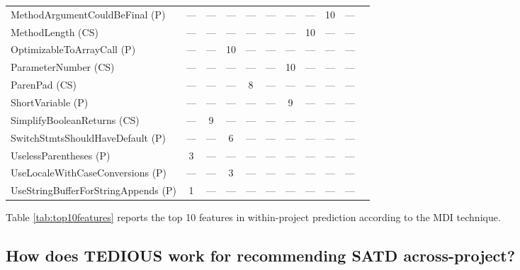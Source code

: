 \begin{table*}[t]
{\begin{tabular}{lcccccccccc}
				\rowcolor{grey}
				MethodArgumentCouldBeFinal (P) &---&---&---&---&---&---&---&10&---\\
				MethodLength (CS) &---&---&---&---&---&---&10&---&---\\
				\rowcolor{grey}
				OptimizableToArrayCall (P) &---&---&10&---&---&---&---&---&---\\
				ParameterNumber (CS) &---&---&---&---&---&10&---&---&---\\
				\rowcolor{grey}
				ParenPad (CS) &---&---&---&8&---&---&---&---&---\\
				ShortVariable (P) &---&---&---&---&---&9&---&---&---\\
				\rowcolor{grey}
				SimplifyBooleanReturns (CS) &---&9&---&---&---&---&---&---&---\\
				SwitchStmtsShouldHaveDefault (P) &---&---&6&---&---&---&---&---&---\\
				\rowcolor{grey}
				UselessParentheses (P) &3&---&---&---&---&---&---&---&---\\
				UseLocaleWithCaseConversions (P) &---&---&3&---&---&---&---&---&---\\
				\rowcolor{grey}
				UseStringBufferForStringAppends (P) &1&---&---&---&---&---&---&---&---\\
				\hline
			\end{tabular}

	}
	\vspace{-2mm}
\end{table*}

Table \ref{tab:top10features} reports the top 10 features in within-project prediction according to the MDI technique.

\subsection{How does TEDIOUS work for recommending SATD across-project?}

